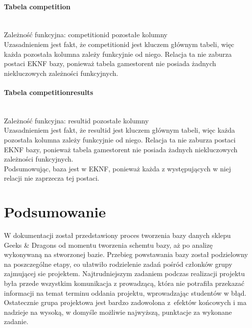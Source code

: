 \documentclass{article}
\begin{document}
	\paragraph{Tabela competition}\mbox{}\vspace{0.2cm} \\
	Zależność funkcyjna: competition\textunderscore id\mbox{} \textrightarrow \mbox{} pozostałe kolumny \vspace{0.2cm} \\
	\noindent Uzasadnieniem jest fakt, że competition\textunderscore id jest kluczem głównym tabeli, więc każda pozostała kolumna zależy funkcyjnie od niego. Relacja ta nie zaburza postaci EKNF bazy, ponieważ tabela games\textunderscore to\textunderscore rent nie posiada żadnych niekluczowych zależności funkcyjnych.
	
	\paragraph{Tabela competition\textunderscore results}\mbox{}\vspace{0.2cm} \\
	Zależność funkcyjna: result\textunderscore id\mbox{} \textrightarrow \mbox{} pozostałe kolumny \vspace{0.2cm} \\
	\noindent Uzasadnieniem jest fakt, że result\textunderscore id jest kluczem głównym tabeli, więc każda pozostała kolumna zależy funkcyjnie od niego. Relacja ta nie zaburza postaci EKNF bazy, ponieważ tabela games\textunderscore to\textunderscore rent nie posiada żadnych niekluczowych zależności funkcyjnych.\\
	
	Podsumowując, baza jest w EKNF, ponieważ każda z występujących w niej relacji nie zaprzecza tej postaci.
	
	\section{Podsumowanie}
	W dokumentacji został przedstawiony proces tworzenia bazy danych sklepu Geeks \& Dragons od momentu tworzenia schemtu bazy, aż po analizę wykonywaną na stworzonej bazie. Przebieg powstawania bazy został podzielowny na poszczególne etapy, co ułatwiło rodzielenie zadań pośród członków grupy zajmującej sie projektem. Najtrudniejszym zadaniem podczas realizacji projektu była przede wszystkim komunikacja z prowadzącą, która nie potrafiła przekazać informacji na temat terminu oddania projektu, wprowadzając studentów w błąd. Ostatecznie grupa projektowa jest bardzo zadowolona z~efektów końcowych i ma nadzieje na wysoką, w domyśle możliwie najwyższą, punktacje za wykonane zadanie.
	
\end{document}

